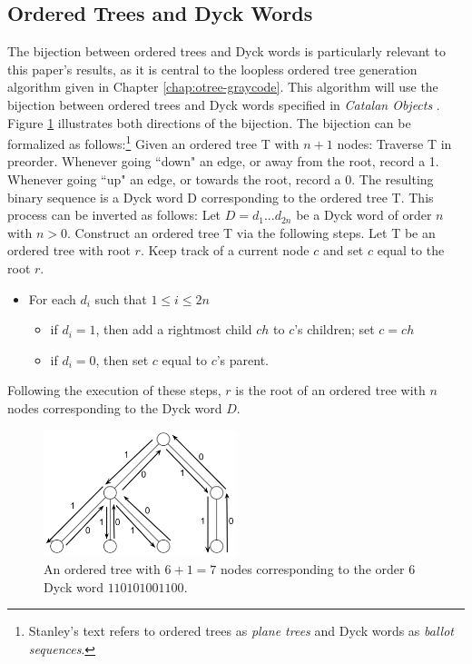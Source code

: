 \subsection{Ordered Trees and Dyck Words} \label{subsec:otree-dyck-bij}
The bijection between ordered trees and Dyck words is particularly relevant to this paper's results, as it is central to the loopless ordered tree generation algorithm given in Chapter \ref{chap:otree-graycode}.
This algorithm will use the bijection between ordered trees and Dyck words specified in \emph{Catalan Objects} \cite{stanley2015Catalan}. Figure \ref{ordered_tree_bijection_illustration} illustrates both directions of the bijection.
The bijection can be formalized as follows:\footnote{ Stanley's text refers to ordered trees as \emph{plane trees} and Dyck words as \emph{ballot sequences}.} 
Given an ordered tree T with $n+1$ nodes: Traverse T in preorder.  Whenever going ``down" an edge, or away from the root, record a 1.  Whenever going ``up" an edge, or towards the root, record a 0.  The resulting binary sequence is a Dyck word D corresponding to the ordered tree T. 
This process can be inverted as follows: 
Let $D=d_1...d_{2n}$ be a Dyck word of order $n$ with $n > 0$. Construct an ordered tree T via the following steps.
Let T be an ordered tree with root $r$.  Keep track of a current node $c$ and set $c$ equal to the root $r$.

\begin{itemize}
    \item For each $d_i$ such that $1 \le i \le 2n$ 
	\begin{itemize}
	    \item if $d_i=1$, then add a rightmost child $ch$ to $c$'s children; set $c=ch$
	    \item if $d_i=0$, then set $c$ equal to $c$'s parent.
	\end{itemize}

\end{itemize}

Following the execution of these steps, $r$ is the root of an ordered tree with $n$ nodes corresponding to the Dyck word $D$.

\begin{figure}
    \centering
    \includegraphics[width=0.5\textwidth]{otreebij.png}
    \caption{An ordered tree with $6+1=7$ nodes corresponding to the order 6 Dyck word $110101001100$.}
    \label{ordered_tree_bijection_illustration}
\end{figure}

